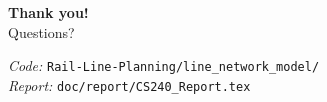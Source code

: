 \documentclass[aspectratio=169, 11pt]{beamer}
\begin{document}
\begin{frame}{}
\centering
\vspace{1cm}
{\Large\textbf{Thank you!}}\\[0.5cm]
{\large Questions?}

\vspace{1.5cm}
\normalsize
\textit{Code:} \texttt{Rail-Line-Planning/line\_network\_model/}\\[0.2cm]
\textit{Report:} \texttt{doc/report/CS240\_Report.tex}
\end{frame}
\end{document}
